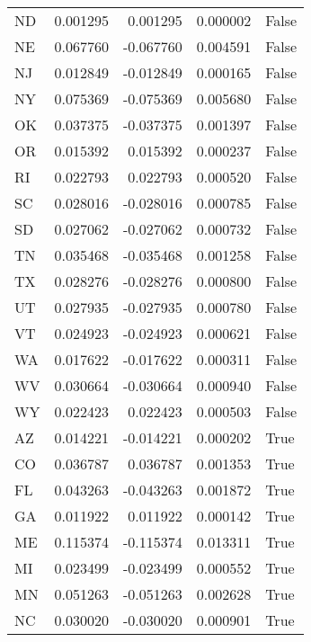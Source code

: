 \begin{table}
\begin{tabular}{lrrrl}
      ND &   0.001295 &  0.001295 &       0.000002 &         False \\
      NE &   0.067760 & -0.067760 &       0.004591 &         False \\
      NJ &   0.012849 & -0.012849 &       0.000165 &         False \\
      NY &   0.075369 & -0.075369 &       0.005680 &         False \\
      OK &   0.037375 & -0.037375 &       0.001397 &         False \\
      OR &   0.015392 &  0.015392 &       0.000237 &         False \\
      RI &   0.022793 &  0.022793 &       0.000520 &         False \\
      SC &   0.028016 & -0.028016 &       0.000785 &         False \\
      SD &   0.027062 & -0.027062 &       0.000732 &         False \\
      TN &   0.035468 & -0.035468 &       0.001258 &         False \\
      TX &   0.028276 & -0.028276 &       0.000800 &         False \\
      UT &   0.027935 & -0.027935 &       0.000780 &         False \\
      VT &   0.024923 & -0.024923 &       0.000621 &         False \\
      WA &   0.017622 & -0.017622 &       0.000311 &         False \\
      WV &   0.030664 & -0.030664 &       0.000940 &         False \\
      WY &   0.022423 &  0.022423 &       0.000503 &         False \\
      AZ &   0.014221 & -0.014221 &       0.000202 &          True \\
      CO &   0.036787 &  0.036787 &       0.001353 &          True \\
      FL &   0.043263 & -0.043263 &       0.001872 &          True \\
      GA &   0.011922 &  0.011922 &       0.000142 &          True \\
      ME &   0.115374 & -0.115374 &       0.013311 &          True \\
      MI &   0.023499 & -0.023499 &       0.000552 &          True \\
      MN &   0.051263 & -0.051263 &       0.002628 &          True \\
      NC &   0.030020 & -0.030020 &       0.000901 &          True \\

\end{tabular}
\end{table}
